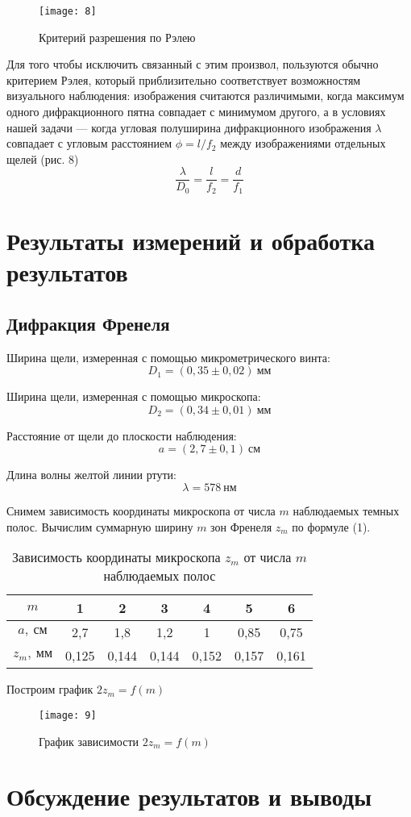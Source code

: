 \documentclass[a4paper, 12pt]{article}
\begin{document}
\begin{wrapfigure}{4}{0.34\linewidth}
    \vspace{-10pt}
    \texttt{[image: 8]}
    \caption{Критерий разрешения по Рэлею}
\end{wrapfigure}

Для того чтобы исключить связанный с этим произвол, пользуются обычно
критерием Рэлея, который приблизительно соответствует возможностям
визуального наблюдения: изображения считаются различимыми, когда
максимум одного дифракционного пятна совпадает с минимумом другого, а
в условиях нашей задачи — когда угловая полуширина дифракционного
изображения $\lambda$ совпадает с угловым расстоянием $\phi = l/f_2$ между
изображениями отдельных щелей (рис. 8)
\begin{equation}
    \frac{\lambda}{D_0} = \frac{l}{f_2} = \frac{d}{f_1}
\end{equation}



\section{Результаты измерений и обработка результатов}
\subsection*{Дифракция Френеля}
Ширина щели, измеренная с помощью микрометрического винта:
\[
    D_1 = (0,35 \pm 0,02)\ \text{мм}
\]

Ширина щели, измеренная с помощью микроскопа:
\[
    D_2 = (0,34 \pm 0,01)\ \text{мм}
\]


Расстояние от щели до плоскости наблюдения:
\[
    a = (2,7 \pm 0,1)\ \text{см}
\]

Длина волны желтой линии ртути:
\[
    \lambda = 578\ \text{нм}
\]


Снимем зависимость координаты микроскопа от числа $m$ наблюдаемых
темных полос. Вычислим суммарную ширину $m$ зон Френеля $z_m$ по
формуле (1).


\begin{table}[H]
\centering
\begin{tabular}{|c|c|c|c|c|c|c|}
   \hline  
$m$  & 1     & 2     & 3     & 4     & 5     & 6     \\ \hline
$a,\ \text{см}$  & 2,7   & 1,8   & 1,2   & 1     & 0,85  & 0,75  \\ \hline
$z_m,\ \text{мм}$ & 0,125 & 0,144 & 0,144 & 0,152 & 0,157 & 0,161 \\ \hline
\end{tabular}
\caption{Зависимость координаты микроскопа $z_m$ от числа $m$
наблюдаемых полос}
\end{table}

Построим график $2z_m = f(m)$

\begin{figure}[H]
    \texttt{[image: 9]} 
    \caption{График зависимости $2z_m = f(m)$}
\end{figure}







\section{Обсуждение результатов и выводы}
\end{document}
